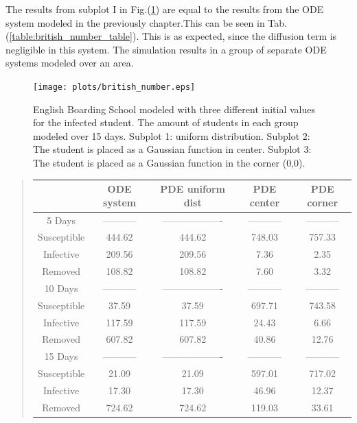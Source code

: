 \documentclass[%
twoside,                 %
final,                   %
10pt]{article}
\begin{document}
\vspace{3mm}


The results from subplot I in Fig.(\ref{fig:british_number}) are equal to the results from the ODE system modeled in the previously chapter.This can be seen in Tab.(\ref{table:british_number_table}). This is as expected, since the diffusion term is negligible in this system. The simulation results in a group of separate ODE systems modeled over an area.


\begin{figure}[ht]
  \centerline{\texttt{[image: plots/british\_number.eps]}}
  \caption{
  \label{fig:british_number} English Boarding School modeled with three different initial values for the infected student. The amount of students in each group modeled over 15 days. Subplot 1: uniform distribution. Subplot 2: The student is placed as a Gaussian function in center. Subplot 3: The student is placed as a Gaussian function in the corner (0,0).
  }
\end{figure}


\label{table:british_number_table}

\begin{quote}
\begin{tabular}{ccccc}
\hline
\multicolumn{1}{c}{  } & \multicolumn{1}{c}{ ODE system } & \multicolumn{1}{c}{ PDE uniform dist } & \multicolumn{1}{c}{ PDE center } & \multicolumn{1}{c}{ PDE corner } \\
\hline
5 Days      & ----------- & ------------------- & ----------- & ----------- \\
\hline
Susceptible & 444.62      & 444.62              & 748.03      & 757.33      \\
Infective   & 209.56      & 209.56              & 7.36        & 2.35        \\
Removed     & 108.82      & 108.82              & 7.60        & 3.32        \\
\hline
10 Days     & ----------- & ------------------- & ----------- & ----------- \\
\hline
Susceptible & 37.59       & 37.59               & 697.71      & 743.58      \\
Infective   & 117.59      & 117.59              & 24.43       & 6.66        \\
Removed     & 607.82      & 607.82              & 40.86       & 12.76       \\
\hline
15 Days     & ----------- & ------------------- & ----------- & ----------- \\
\hline
Susceptible & 21.09       & 21.09               & 597.01      & 717.02      \\
Infective   & 17.30       & 17.30               & 46.96       & 12.37       \\
Removed     & 724.62      & 724.62              & 119.03      & 33.61       \\
\hline
\end{tabular}
\end{quote}
\end{document}
